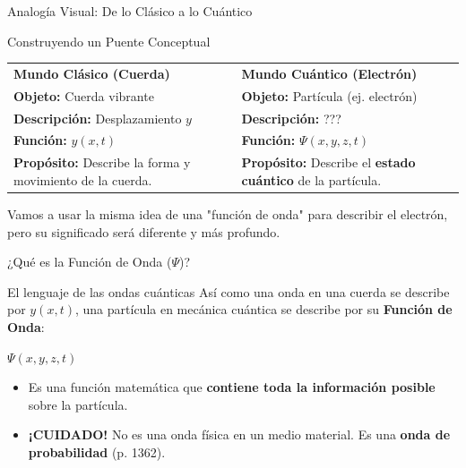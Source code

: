 \documentclass[12pt,aspectratio=169]{beamer}
\begin{document}
	\begin{frame}{Analogía Visual: De lo Clásico a lo Cuántico}
		\begin{block}{Construyendo un Puente Conceptual}
			\begin{tabular}{|m{0.45\textwidth}|m{}|}
			
				\centering \textbf{Mundo Clásico (Cuerda)} & \centering \textbf{Mundo Cuántico (Electrón)} \\
			
				\textbf{Objeto:} Cuerda vibrante & \textbf{Objeto:} Partícula (ej. electrón) \\
				\textbf{Descripción:} Desplazamiento $y$ & \textbf{Descripción:} ??? \\
				\textbf{Función:} \large $y(x, t)$ & \textbf{Función:} \large $\Psi(x, y, z, t)$ \\
				\textbf{Propósito:} Describe la forma y movimiento de la cuerda. & \textbf{Propósito:} Describe el \textbf{estado cuántico} de la partícula. 
			\end{tabular}
		\end{block}
		\vspace{1em}
		Vamos a usar la misma idea de una "función de onda" para describir el electrón, pero su significado será diferente y más profundo.
\end{frame}
	
	\begin{frame}{¿Qué es la Función de Onda ($\Psi$)?}
		\begin{block}{El lenguaje de las ondas cuánticas}
			Así como una onda en una cuerda se describe por $y(x, t)$, una partícula en mecánica cuántica se describe por su \textbf{Función de Onda}:
			\begin{center}
				\Huge $\Psi(x, y, z, t)$
			\end{center}
			\begin{itemize}
				\item Es una función matemática que \textbf{contiene toda la información posible} sobre la partícula.
				\item \textbf{¡CUIDADO!} No es una onda física en un medio material. Es una \textbf{onda de probabilidad} (p. 1362).
			\end{itemize}
		\end{block}
	\end{frame}
	
\end{document}
